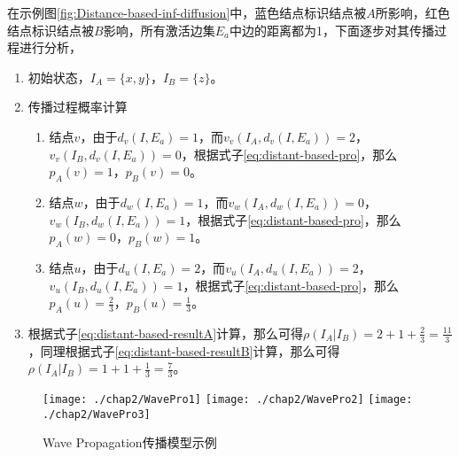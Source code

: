 在示例图\ref{fig:Distance-based-inf-diffusion}中，蓝色结点标识结点被$A$所影响，红色结点标识结点被$B$影响，所有激活边集$E_{a}$中边的距离都为1，下面逐步对其传播过程进行分析，
\begin{enumerate}
\item 初始状态，$I_{A}=\{x, y\}$，$I_{B}=\{z\}$。
\item 传播过程概率计算
	\begin{enumerate}
	\item 结点$v$，由于$d_{v}(I, E_{a})=1$，而$v_{v}(I_{A}, d_{v}(I, E_{a}))=2$，$v_{v}(I_{B}, d_{v}(I, E_{a}))=0$，根据式子\ref{eq:distant-based-pro}，那么$p_{A}(v)=1$，$p_{B}(v)=0$。
	\item 结点$w$，由于$d_{w}(I, E_{a})=1$，而$v_{w}(I_{A}, d_{w}(I, E_{a}))=0$，$v_{w}(I_{B}, d_{w}(I, E_{a}))=1$，根据式子\ref{eq:distant-based-pro}，那么$p_{A}(w)=0$，$p_{B}(w)=1$。
	\item 结点$u$，由于$d_{u}(I, E_{a})=2$，而$v_{u}(I_{A}, d_{u}(I, E_{a}))=2$，$v_{u}(I_{B}, d_{u}(I, E_{a}))=1$，根据式子\ref{eq:distant-based-pro}，那么$p_{A}(u)=\frac{2}{3}$，$p_{B}(u)=\frac{1}{3}$。
	\end{enumerate}
\item 根据式子\ref{eq:distant-based-resultA}计算，那么可得$\rho(I_{A}|I_{B})=2+1+\frac{2}{3}=\frac{11}{3}$，同理根据式子\ref{eq:distant-based-resultB}计算，那么可得$\rho(I_{A}|I_{B})=1+1+\frac{1}{3}=\frac{7}{3}$。
\end{enumerate}


\begin{figure}[H]
\centering%
	{\texttt{[image: ./chap2/WavePro1]}}
	\hspace{1mm}%
	{\texttt{[image: ./chap2/WavePro2]}}
	\hspace{1mm}%
	{\texttt{[image: ./chap2/WavePro3]}}
	\caption{Wave Propagation传播模型示例}
	\label{fig:wavepro-inf-diffusion}
\end{figure}


